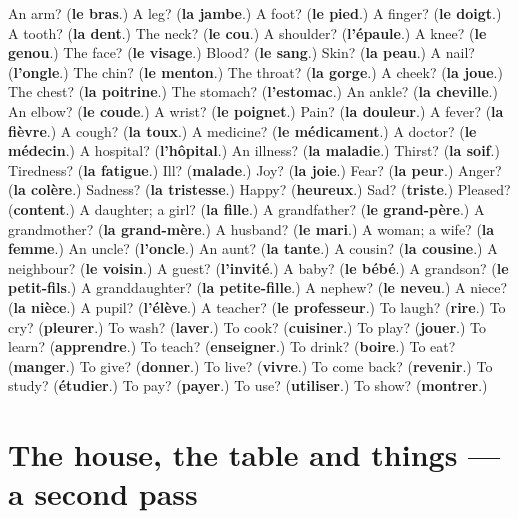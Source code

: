 \begin{tcolorbox}[breakable,colback=teal!4,colframe=teal!35!black,title={Before you move on}]
An arm? (\textbf{le bras}.) A leg? (\textbf{la jambe}.) A foot? (\textbf{le pied}.) A finger? (\textbf{le doigt}.) A tooth? (\textbf{la dent}.) The neck? (\textbf{le cou}.) A shoulder? (\textbf{l'épaule}.) A knee? (\textbf{le genou}.) The face? (\textbf{le visage}.) Blood? (\textbf{le sang}.) Skin? (\textbf{la peau}.) A nail? (\textbf{l'ongle}.) The chin? (\textbf{le menton}.) The throat? (\textbf{la gorge}.) A cheek? (\textbf{la joue}.) The chest? (\textbf{la poitrine}.) The stomach? (\textbf{l'estomac}.) An ankle? (\textbf{la cheville}.) An elbow? (\textbf{le coude}.) A wrist? (\textbf{le poignet}.) Pain? (\textbf{la douleur}.) A fever? (\textbf{la fièvre}.) A cough? (\textbf{la toux}.) A medicine? (\textbf{le médicament}.) A doctor? (\textbf{le médecin}.) A hospital? (\textbf{l'hôpital}.) An illness? (\textbf{la maladie}.) Thirst? (\textbf{la soif}.) Tiredness? (\textbf{la fatigue}.) Ill? (\textbf{malade}.) Joy? (\textbf{la joie}.) Fear? (\textbf{la peur}.) Anger? (\textbf{la colère}.) Sadness? (\textbf{la tristesse}.) Happy? (\textbf{heureux}.) Sad? (\textbf{triste}.) Pleased? (\textbf{content}.) A daughter; a girl? (\textbf{la fille}.) A grandfather? (\textbf{le grand-père}.) A grandmother? (\textbf{la grand-mère}.) A husband? (\textbf{le mari}.) A woman; a wife? (\textbf{la femme}.) An uncle? (\textbf{l'oncle}.) An aunt? (\textbf{la tante}.) A cousin? (\textbf{la cousine}.) A neighbour? (\textbf{le voisin}.) A guest? (\textbf{l'invité}.) A baby? (\textbf{le bébé}.) A grandson? (\textbf{le petit-fils}.) A granddaughter? (\textbf{la petite-fille}.) A nephew? (\textbf{le neveu}.) A niece? (\textbf{la nièce}.) A pupil? (\textbf{l'élève}.) A teacher? (\textbf{le professeur}.) To laugh? (\textbf{rire}.) To cry? (\textbf{pleurer}.) To wash? (\textbf{laver}.) To cook? (\textbf{cuisiner}.) To play? (\textbf{jouer}.) To learn? (\textbf{apprendre}.) To teach? (\textbf{enseigner}.) To drink? (\textbf{boire}.) To eat? (\textbf{manger}.) To give? (\textbf{donner}.) To live? (\textbf{vivre}.) To come back? (\textbf{revenir}.) To study? (\textbf{étudier}.) To pay? (\textbf{payer}.) To use? (\textbf{utiliser}.) To show? (\textbf{montrer}.)
\end{tcolorbox}
\section[(dialogue)]{The house, the table and things — a second pass}

